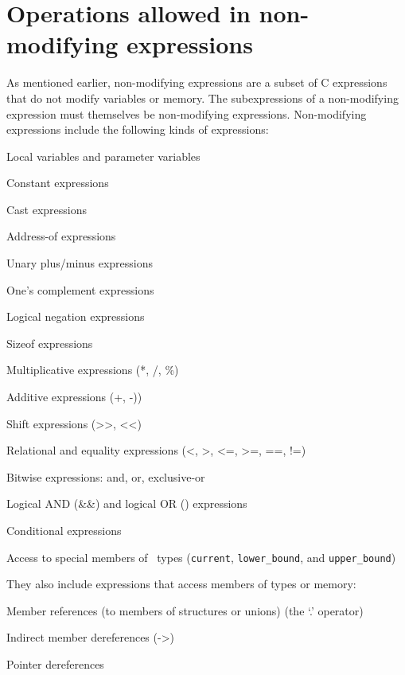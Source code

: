 \section{Operations allowed in non-modifying expressions}
\label{section:non-modifying-expressions}

As mentioned earlier, non-modifying expressions are a subset of C
expressions that do not modify variables or memory. The subexpressions
of a non-modifying expression must themselves be non-modifying
expressions. Non-modifying expressions include the following kinds of
expressions:

\begin{compactitem}
\item
  Local variables and parameter variables
\item
  Constant expressions
\item
  Cast expressions
\item
  Address-of expressions
\item
  Unary plus/minus expressions
\item
  One's complement expressions
\item
  Logical negation expressions
\item
  Sizeof expressions
\item
  Multiplicative expressions (*, /, \%)
\item
  Additive expressions (+, -))
\item
  Shift expressions (\textgreater{}\textgreater{},
  \textless{}\textless{})
\item
  Relational and equality expressions (\textless{}, \textgreater{},
  \textless{}=, \textgreater{}=, ==, !=)
\item
  Bitwise expressions: and, or, exclusive-or
\item
  Logical AND (\&\&) and logical OR (\textbar{}\textbar{}) expressions
\item
  Conditional expressions
\item
  Access to special members of \arrayview\ types
  (\texttt{current}, \texttt{lower\_bound}, and \texttt{upper\_bound})
\end{compactitem}

They also include expressions that access members of types or memory:

\begin{compactitem}
\item
  Member references (to members of structures or unions) (the `.'
  operator)
\item
  Indirect member dereferences (-\textgreater{})
\item
  Pointer dereferences
\end{compactitem}

